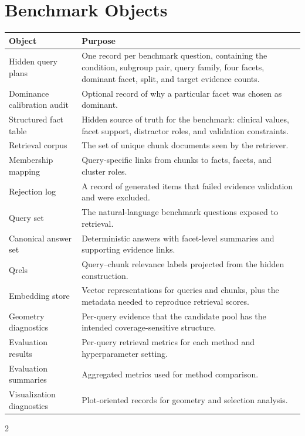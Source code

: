 \documentclass[11pt,a4paper]{article}
\begin{document}
\section{Benchmark Objects}

\begingroup
\renewcommand{\arraystretch}{1.25}
\begin{center}
	\begin{tabular}{@{}p{4.8cm}p{9.8cm}@{}}
		\toprule
		\textbf{Object} & \textbf{Purpose} \\
		\midrule
		Hidden query plans & One record per benchmark question, containing the condition, subgroup pair, query family, four facets, dominant facet, split, and target evidence counts. \\
		Dominance calibration audit & Optional record of why a particular facet was chosen as dominant. \\
		Structured fact table & Hidden source of truth for the benchmark: clinical values, facet support, distractor roles, and validation constraints. \\
		Retrieval corpus & The set of unique chunk documents seen by the retriever. \\
		Membership mapping & Query-specific links from chunks to facts, facets, and cluster roles. \\
		Rejection log & A record of generated items that failed evidence validation and were excluded. \\
		Query set & The natural-language benchmark questions exposed to retrieval. \\
		Canonical answer set & Deterministic answers with facet-level summaries and supporting evidence links. \\
		Qrels & Query--chunk relevance labels projected from the hidden construction. \\
		Embedding store & Vector representations for queries and chunks, plus the metadata needed to reproduce retrieval scores. \\
		Geometry diagnostics & Per-query evidence that the candidate pool has the intended coverage-sensitive structure. \\
		Evaluation results & Per-query retrieval metrics for each method and hyperparameter setting. \\
		Evaluation summaries & Aggregated metrics used for method comparison. \\
		Visualization diagnostics & Plot-oriented records for geometry and selection analysis. \\
		\bottomrule
	\end{tabular}
\end{center}
\endgroup

\newpage
\begingroup
\footnotesize
\begin{multicols}{2}
	
\end{multicols}
\endgroup
\end{document}
